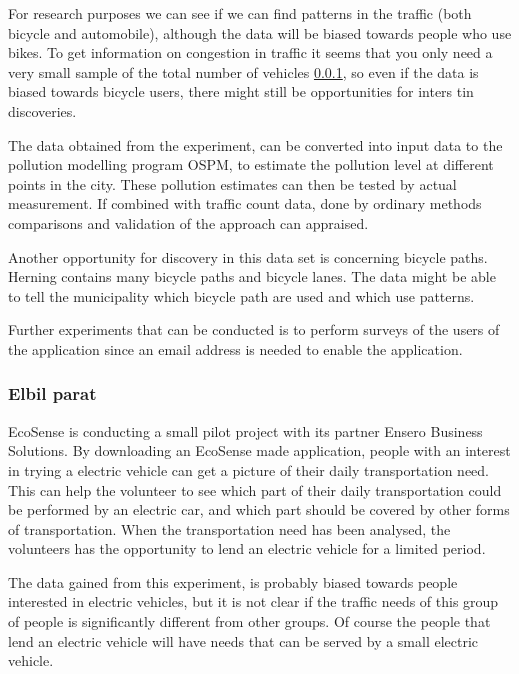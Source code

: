For research purposes we can see if we can find patterns in the traffic (both bicycle and automobile), although the data will be biased towards people who use bikes. To get information on congestion in traffic it seems that you only need a very small sample of the total number of vehicles \ref{}, so even if the data is biased towards bicycle users, there might still be opportunities for inters tin discoveries.

The data obtained from the experiment, can be converted into input data to the pollution modelling program OSPM, to estimate the pollution level at different points in the city. These pollution estimates can then be tested by actual measurement. If combined with traffic count data, done by ordinary methods comparisons and validation of the approach can appraised.

Another opportunity for discovery in this data set is concerning bicycle paths. Herning contains many bicycle paths and bicycle lanes. The data might be able to tell the municipality which bicycle path are used and which use patterns.

Further experiments that can be conducted is to perform surveys of the users of the application since an email address is needed to enable the application.

\subsubsection{Elbil parat}

EcoSense is conducting a small pilot project with its partner Ensero Business Solutions. By downloading an EcoSense made application, people with an interest in trying a electric vehicle can get a picture of their daily transportation need. This can help the volunteer to see which part of their daily transportation could be performed by an electric car, and which part should be covered by other forms of transportation. When the transportation need has been analysed, the volunteers has the opportunity to lend an electric vehicle for a limited period.

The data gained from this experiment, is probably biased towards people interested in electric vehicles, but it is not clear if the traffic needs of this group of people is significantly different from other groups. Of course the people that lend an electric vehicle will have needs that can be served by a small electric vehicle.


